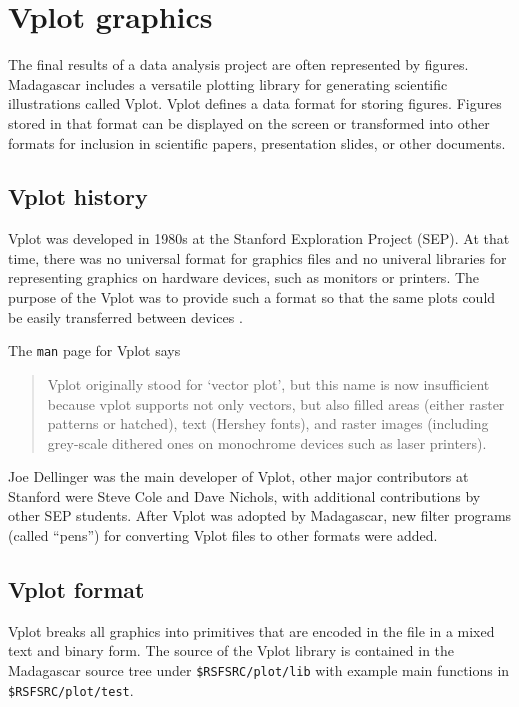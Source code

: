 \chapter{Vplot graphics}

The final results of a data analysis project are often represented by figures. Madagascar includes a versatile plotting library for generating scientific illustrations called Vplot. Vplot defines a data format for storing figures. Figures stored in that format can be displayed on the screen or transformed into other formats for inclusion in scientific papers, presentation slides, or other documents.

\section{Vplot history}

Vplot was developed in 1980s at the Stanford Exploration Project
(SEP). At that time, there was no universal format for graphics files
and no univeral libraries for representing graphics on hardware
devices, such as monitors or printers. The purpose of the Vplot was to
provide such a format so that the same plots could be easily
transferred between devices
\cite[]{Cole.sep.60.349,Dellinger.sep.61.327}.


The \texttt{man} page for Vplot says
  \begin{quote}
    Vplot originally stood for `vector plot', but this name is now
    insufficient because vplot supports not only vectors, but also
    filled areas (either raster patterns or hatched), text (Hershey
    fonts), and raster images (including grey-scale dithered ones on
    monochrome devices such as laser printers).
    \end{quote}

Joe Dellinger was the main developer of Vplot, other major
contributors at Stanford were Steve Cole and Dave Nichols, with
additional contributions by other SEP students. After Vplot was
adopted by Madagascar, new filter programs (called ``pens'') for
converting Vplot files to other formats were added.

\section{Vplot format}

Vplot breaks all graphics into primitives that are encoded in the file
in a mixed text and binary form. The source of the Vplot library is
contained in the Madagascar source tree under
\texttt{\$RSFSRC/plot/lib} with example main functions in
\texttt{\$RSFSRC/plot/test}.


